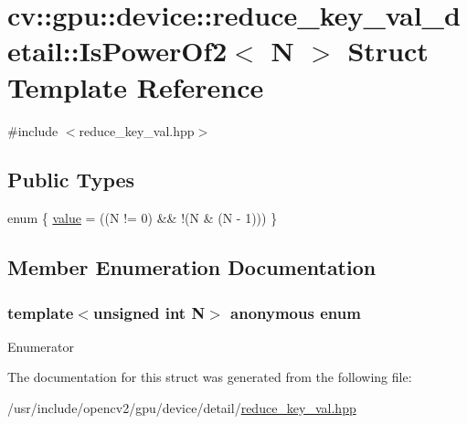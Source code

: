 \hypertarget{structcv_1_1gpu_1_1device_1_1reduce__key__val__detail_1_1IsPowerOf2}{\section{cv\-:\-:gpu\-:\-:device\-:\-:reduce\-\_\-key\-\_\-val\-\_\-detail\-:\-:Is\-Power\-Of2$<$ N $>$ Struct Template Reference}
\label{structcv_1_1gpu_1_1device_1_1reduce__key__val__detail_1_1IsPowerOf2}
}


{\ttfamily \#include $<$reduce\-\_\-key\-\_\-val.\-hpp$>$}

\subsection*{Public Types}
\begin{DoxyCompactItemize}
\item 
enum \{ \hyperlink{structcv_1_1gpu_1_1device_1_1reduce__key__val__detail_1_1IsPowerOf2_a1130a8c7d9412a687d123683d944b3b3a3e7e451351747a5929df4680575438e6}{value} = ((N != 0) \&\& !(N \& (N -\/ 1)))
 \}
\end{DoxyCompactItemize}


\subsection{Member Enumeration Documentation}
\hypertarget{structcv_1_1gpu_1_1device_1_1reduce__key__val__detail_1_1IsPowerOf2_a1130a8c7d9412a687d123683d944b3b3}{\subsubsection[{anonymous enum}]{\setlength{\rightskip}{0pt plus 5cm}template$<$unsigned int N$>$ anonymous enum}}\label{structcv_1_1gpu_1_1device_1_1reduce__key__val__detail_1_1IsPowerOf2_a1130a8c7d9412a687d123683d944b3b3}
\begin{Desc}
\item[Enumerator]\par
\begin{description}
\item[{\em 
\hypertarget{structcv_1_1gpu_1_1device_1_1reduce__key__val__detail_1_1IsPowerOf2_a1130a8c7d9412a687d123683d944b3b3a3e7e451351747a5929df4680575438e6}{value}\label{structcv_1_1gpu_1_1device_1_1reduce__key__val__detail_1_1IsPowerOf2_a1130a8c7d9412a687d123683d944b3b3a3e7e451351747a5929df4680575438e6}
}]\end{description}
\end{Desc}


The documentation for this struct was generated from the following file\-:\begin{DoxyCompactItemize}
\item 
/usr/include/opencv2/gpu/device/detail/\hyperlink{reduce__key__val_8hpp}{reduce\-\_\-key\-\_\-val.\-hpp}\end{DoxyCompactItemize}
